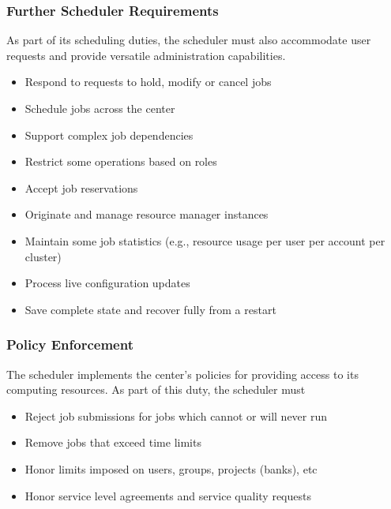 \subsubsection{Further Scheduler Requirements}

As part of its scheduling duties, the scheduler must also accommodate
user requests and provide versatile administration capabilities.

\begin{itemize}
  \item Respond to requests to hold, modify or cancel jobs
  \item Schedule jobs across the center
  \item Support complex job dependencies
  \item Restrict some operations based on roles
  \item Accept job reservations
  \item Originate and manage resource manager instances
  \item Maintain some job statistics (e.g., resource usage per user
    per account per cluster)
  \item Process live configuration updates
  \item Save complete state and recover fully from a restart
\end{itemize}

\subsubsection{Policy Enforcement}

The scheduler implements the center's policies for providing access to
its computing resources.  As part of this duty, the scheduler must

\begin{itemize}
  \item Reject job submissions for jobs which cannot or will never run
  \item Remove jobs that exceed time limits
  \item Honor limits imposed on users, groups, projects (banks), etc
  \item Honor service level agreements and service quality requests
\end{itemize}
